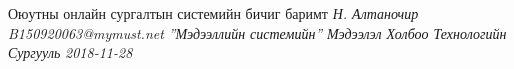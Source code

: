\thesistitle
	{ Оюутны онлайн сургалтын системийн бичиг баримт}
	{\emph{ Н. Алтаночир\\B150920063@mymust.net}}
	{\emph{''Мэдээллийн системийн''}}
	{\emph{ Мэдээлэл Холбоо Технологийн Сургууль}}
	{\emph{2018-11-28}}
